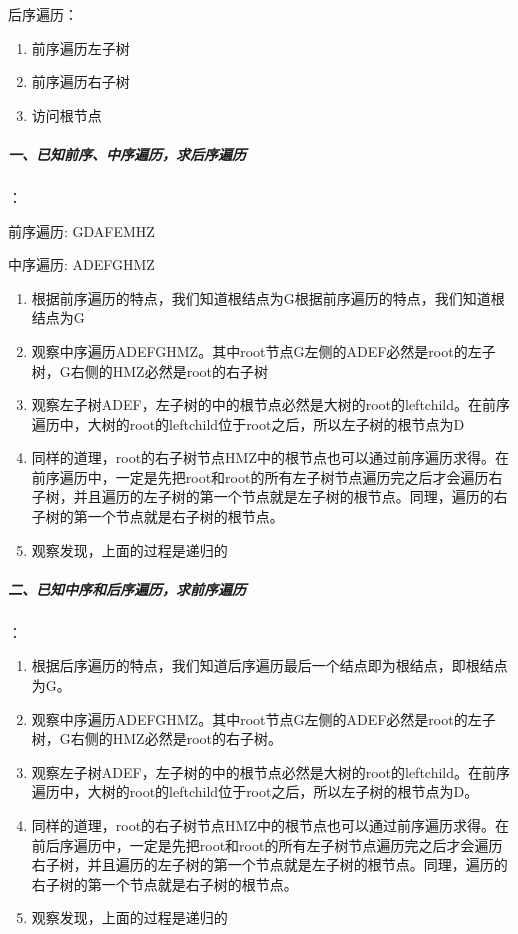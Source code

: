 \documentclass[UTF8,a4paper,12pt]{ctexbook}
\begin{document}
		后序遍历： 
		\begin{enumerate}[itemindent = 2em]
			\item 前序遍历左子树 
			\item 前序遍历右子树
			\item 访问根节点 
		\end{enumerate}
		
		\subparagraph{一、已知前序、中序遍历，求后序遍历}：
		
			前序遍历:         GDAFEMHZ
			
			中序遍历:         ADEFGHMZ
			
			\begin{enumerate}[itemindent = 1em]
				\item 根据前序遍历的特点，我们知道根结点为G根据前序遍历的特点，我们知道根结点为G
				\item 观察中序遍历ADEFGHMZ。其中root节点G左侧的ADEF必然是root的左子树，G右侧的HMZ必然是root的右子树
				\item 观察左子树ADEF，左子树的中的根节点必然是大树的root的leftchild。在前序遍历中，大树的root的leftchild位于root之后，所以左子树的根节点为D
				\item 同样的道理，root的右子树节点HMZ中的根节点也可以通过前序遍历求得。在前序遍历中，一定是先把root和root的所有左子树节点遍历完之后才会遍历右子树，并且遍历的左子树的第一个节点就是左子树的根节点。同理，遍历的右子树的第一个节点就是右子树的根节点。
				\item 观察发现，上面的过程是递归的
			\end{enumerate}
		
		\subparagraph{二、已知中序和后序遍历，求前序遍历}：
		
			\begin{enumerate}[itemindent = 1em]
				\item 根据后序遍历的特点，我们知道后序遍历最后一个结点即为根结点，即根结点为G。
				\item 观察中序遍历ADEFGHMZ。其中root节点G左侧的ADEF必然是root的左子树，G右侧的HMZ必然是root的右子树。
				\item 观察左子树ADEF，左子树的中的根节点必然是大树的root的leftchild。在前序遍历中，大树的root的leftchild位于root之后，所以左子树的根节点为D。
				\item 同样的道理，root的右子树节点HMZ中的根节点也可以通过前序遍历求得。在前后序遍历中，一定是先把root和root的所有左子树节点遍历完之后才会遍历右子树，并且遍历的左子树的第一个节点就是左子树的根节点。同理，遍历的右子树的第一个节点就是右子树的根节点。
				\item 观察发现，上面的过程是递归的
			\end{enumerate}
		
\end{document}
